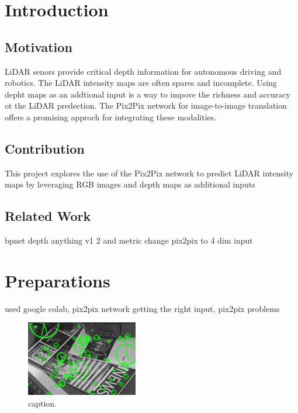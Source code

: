\chapter{Introduction}
\label{chap:intro}

\section{Motivation}
\label{sect:motivation}
LiDAR senors provide critical depth information for autonomous driving and robotics. The LiDAR intensity maps are often spares and incomplete. Using depht maps as an addtional input is a way to impove the richness and accuracy ot the LiDAR predection. The Pix2Pix network for image-to-image translation offers a promising approch for integrating these modalities. 
\section{Contribution}
This project explores the use of the Pix2Pix network to predict LiDAR intensity maps by leveraging RGB images and depth maps as additional inputs
\section{Related Work}
bpnet depth anything v1 2 and metric change pix2pix to 4 dim input
\chapter{Preparations}
used google colab, pix2pix network getting the right input, pix2pix problems
\begin{figure}[!ht]
	\centering
	\includegraphics[width=0.9\linewidth]{image.jpg}
	\caption{caption.}
	\label{img:example}
\end{figure}
